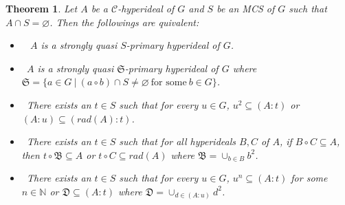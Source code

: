 \documentclass[preprint,review,10pt]{amsart}
\newtheorem{theorem}{Theorem}[section]
\theoremstyle{definition}
\theoremstyle{remark}
\numberwithin{equation}{section}
\begin{document}
 \begin{theorem} \label{42}
 Let $A$ be a   $\mathcal{C}$-hyperideal of $G$ and $S$ be an MCS of $G$ such that $A \cap S=\varnothing$. Then the followings are quivalent:
 \begin{itemize}
\item[\rm{(i)}]~ $A$ is a strongly quasi $S$-primary  hyperideal of $G$.
\item[\rm{(ii)}]~$A$ is a strongly quasi $\mathfrak{S}$-primary  hyperideal of $G$ where $\mathfrak{S}=\{a \in G \ \vert \ (a \circ b) \cap S \neq  \varnothing  \ \text{for some} \ b \in G\}$.
\item[\rm{(iii)}]~There exists an $t \in S$ such that for every $u \in G$, $u^2 \subseteq (A: t)$ or $(A : u) \subseteq (rad(A) : t)$. 
\item[\rm{(iv)}]~There exists an $t \in S$ such that for all hyperideals $B, C$ of $A$, if $B \circ C \subseteq A$, then $t \circ \mathfrak{B} \subseteq A$ or $t \circ C \subseteq rad(A)$ where $\mathfrak{B}=\cup_{b \in B} b^2 $.
\item[\rm{(v)}]~There exists an $t \in S$ such that for every $u \in G$, $u^n  \subseteq (A : t)$ for some $n \in \mathbb{N}$ or $\mathfrak{D} \subseteq (A:t)$ where $\mathfrak{D}=\cup_{d \in (A: u)} d^2$.
 \end{itemize}
 \end{theorem}
\end{document}
